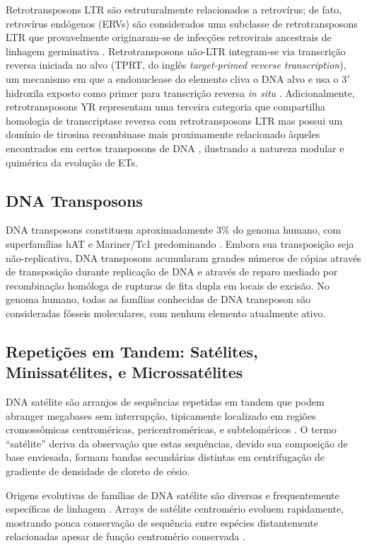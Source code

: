 Retrotransposons LTR são estruturalmente relacionados a retrovírus; de fato, retrovírus endógenos (ERVs) são considerados uma subclasse de retrotransposons LTR que provavelmente originaram-se de infecções retrovirais ancestrais de linhagem germinativa \parencite{jern2008}. Retrotransposons não-LTR integram-se via transcrição reversa iniciada no alvo (TPRT, do inglês \textit{target-primed reverse transcription}), um mecanismo em que a endonuclease do elemento cliva o DNA alvo e usa o 3$'$ hidroxila exposto como primer para transcrição reversa \textit{in situ} \parencite{luan1993}. Adicionalmente, retrotransposons YR representam uma terceira categoria que compartilha homologia de transcriptase reversa com retrotransposons LTR mas possui um domínio de tirosina recombinase mais proximamente relacionado àqueles encontrados em certos transposons de DNA \parencite{goodwin2003}, ilustrando a natureza modular e quimérica da evolução de ETs.

\subsection{DNA Transposons}

DNA transposons constituem aproximadamente 3\% do genoma humano, com superfamílias hAT e Mariner/Tc1 predominando \parencite{cordaux2009}. Embora sua transposição seja não-replicativa, DNA transposons acumularam grandes números de cópias através de transposição durante replicação de DNA e através de reparo mediado por recombinação homóloga de rupturas de fita dupla em locais de excisão. No genoma humano, todas as famílias conhecidas de DNA transposon são consideradas fósseis moleculares, com nenhum elemento atualmente ativo.

\subsection{Repetições em Tandem: Satélites, Minissatélites, e Microssatélites}

DNA satélite são arranjos de sequências repetidas em tandem que podem abranger megabases sem interrupção, tipicamente localizado em regiões cromossômicas centroméricas, pericentroméricas, e subteloméricos \parencite{garrido-ramos2017}. O termo ``satélite'' deriva da observação que estas sequências, devido sua composição de base enviesada, formam bandas secundárias distintas em centrifugação de gradiente de densidade de cloreto de césio.

Origens evolutivas de famílias de DNA satélite são diversas e frequentemente específicas de linhagem \parencite{plohl2012}. Arrays de satélite centromério evoluem rapidamente, mostrando pouca conservação de sequência entre espécies distantemente relacionadas apesar de função centromério conservada \parencite{henikoff2001,malik2009}.

